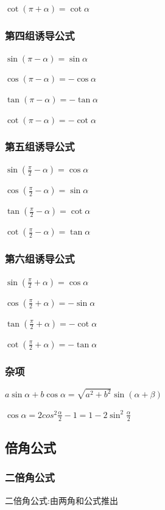 \documentclass[UTF8]{ctexbook}
\begin{document}
{{{{    $\cot(\pi + \alpha) = \cot\alpha$
  }%

  \subsubsection{第四组诱导公式}{
    $\sin(\pi - \alpha) = \sin\alpha$

    $\cos(\pi - \alpha) = -\cos\alpha$

    $\tan(\pi - \alpha) = -\tan\alpha$

    $\cot(\pi - \alpha) = -\cot\alpha$
  }%

  \subsubsection{第五组诱导公式}{
    $\sin(\frac{\pi}{2} - \alpha) = \cos\alpha$

    $\cos(\frac{\pi}{2} - \alpha) = \sin\alpha$

    $\tan(\frac{\pi}{2} - \alpha) = \cot\alpha$

    $\cot(\frac{\pi}{2} - \alpha) = \tan\alpha$
  }%

  \subsubsection{第六组诱导公式}{
    $\sin(\frac{\pi}{2} + \alpha) = \cos\alpha$

    $\cos(\frac{\pi}{2} + \alpha) = -\sin\alpha$

    $\tan(\frac{\pi}{2} + \alpha) = -\cot\alpha$

    $\cot(\frac{\pi}{2} + \alpha) = -\tan\alpha$
  }%

  \subsubsection{杂项}{
    $a\sin\alpha + b\cos\alpha = \sqrt{a^2 + b^2}\sin(\alpha+\beta)$

    $\cos\alpha = 2cos^2\frac{\alpha}{2} - 1 = 1-2\sin^2\frac{\alpha}{2}$
  }%

}%

\subsection{倍角公式}{

  \subsubsection{二倍角公式}{
    二倍角公式:由两角和公式推出

}}}}
\end{document}

